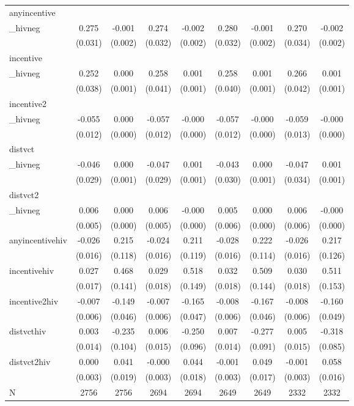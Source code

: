 \begin{tabular}{lcccccccc}
\hline
anyincentive\\_hivneg & 0.275 & -0.001 & 0.274 & -0.002 & 0.280 & -0.001 & 0.270 & -0.002 \\
 & (0.031) & (0.002) & (0.032) & (0.002) & (0.032) & (0.002) & (0.034) & (0.002) \\
incentive\\_hivneg & 0.252 & 0.000 & 0.258 & 0.001 & 0.258 & 0.001 & 0.266 & 0.001 \\
 & (0.038) & (0.001) & (0.041) & (0.001) & (0.040) & (0.001) & (0.042) & (0.001) \\
incentive2\\_hivneg & -0.055 & 0.000 & -0.057 & -0.000 & -0.057 & -0.000 & -0.059 & -0.000 \\
 & (0.012) & (0.000) & (0.012) & (0.000) & (0.012) & (0.000) & (0.013) & (0.000) \\
distvct\\_hivneg & -0.046 & 0.000 & -0.047 & 0.001 & -0.043 & 0.000 & -0.047 & 0.001 \\
 & (0.029) & (0.001) & (0.029) & (0.001) & (0.030) & (0.001) & (0.034) & (0.001) \\
distvct2\\_hivneg & 0.006 & 0.000 & 0.006 & -0.000 & 0.005 & 0.000 & 0.006 & -0.000 \\
 & (0.005) & (0.000) & (0.005) & (0.000) & (0.006) & (0.000) & (0.006) & (0.000) \\
anyincentivehiv & -0.026 & 0.215 & -0.024 & 0.211 & -0.028 & 0.222 & -0.026 & 0.217 \\
 & (0.016) & (0.118) & (0.016) & (0.119) & (0.016) & (0.114) & (0.016) & (0.126) \\
incentivehiv & 0.027 & 0.468 & 0.029 & 0.518 & 0.032 & 0.509 & 0.030 & 0.511 \\
 & (0.017) & (0.141) & (0.018) & (0.149) & (0.018) & (0.144) & (0.018) & (0.153) \\
incentive2hiv & -0.007 & -0.149 & -0.007 & -0.165 & -0.008 & -0.167 & -0.008 & -0.160 \\
 & (0.006) & (0.046) & (0.006) & (0.047) & (0.006) & (0.046) & (0.006) & (0.049) \\
distvcthiv & 0.003 & -0.235 & 0.006 & -0.250 & 0.007 & -0.277 & 0.005 & -0.318 \\
 & (0.014) & (0.104) & (0.015) & (0.096) & (0.014) & (0.091) & (0.015) & (0.085) \\
distvct2hiv & 0.000 & 0.041 & -0.000 & 0.044 & -0.001 & 0.049 & -0.001 & 0.058 \\
 & (0.003) & (0.019) & (0.003) & (0.018) & (0.003) & (0.017) & (0.003) & (0.016) \\
\hline
N & 2756 & 2756 & 2694 & 2694 & 2649 & 2649 & 2332 & 2332 \\
\hline
\end{tabular}
